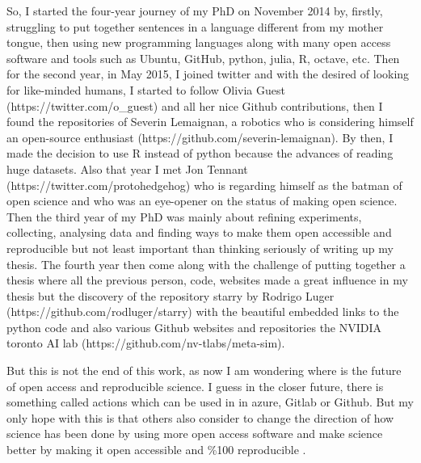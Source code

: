 \documentclass[11pt]{article}
\begin{document}
So, I started the four-year journey of my PhD on November 2014 
by, firstly, struggling to put together sentences in a language
different from my mother tongue, then using new programming 
languages along with many open access software and tools such as 
Ubuntu, GitHub, python, julia, R, octave, etc. 
Then for the second year, in May 2015, I joined twitter and
with the desired of looking for like-minded humans, I started to follow 
Olivia Guest (https://twitter.com/o\_guest) and all her nice Github contributions, 
then I found the repositories of 
Severin Lemaignan, a robotics who is considering himself
an open-source enthusiast (https://github.com/severin-lemaignan). 
By then, I made the decision to use R instead of python because 
the advances of reading huge datasets. Also that year I met 
Jon Tennant (https://twitter.com/protohedgehog) 
who is regarding himself as the batman of open science
and who was an eye-opener on the status of making open 
science.
Then the third year of my PhD was mainly about refining experiments, 
collecting, analysing data and finding ways to make them open accessible 
and reproducible but not least important than thinking seriously 
of writing up my thesis. 
The fourth year then come along with the challenge of 
putting together a thesis where 
all the previous person, code, websites made a great influence 
in my thesis but the discovery of the repository starry 
by Rodrigo Luger (https://github.com/rodluger/starry)
with the beautiful embedded links to the python code
and also various Github websites and repositories the NVIDIA toronto AI lab
(https://github.com/nv-tlabs/meta-sim).




But this is not the end of this work, as now I am wondering 
where is the future of open access and reproducible science.
I guess in the closer future, there is something called actions 
which can be used in
in azure, Gitlab or Github.
But my only hope with this is that others also consider 
to change the direction of how science has been done by 
using more open access software and make science better 
by making it
open accessible and \%100 reproducible 
\citep{xochicale2019-github}.






\end{document}
